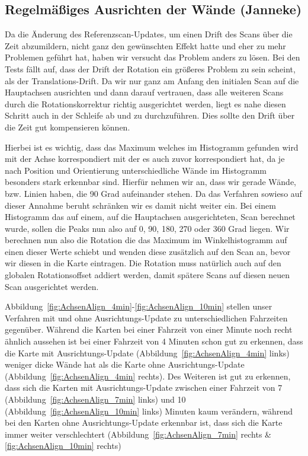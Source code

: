 \subsection{Regelmäßiges Ausrichten der Wände (Janneke)}

Da die Änderung des Referenzscan-Updates, um einen Drift des Scans über die Zeit abzumildern, nicht ganz den gewünschten Effekt hatte und eher zu mehr Problemen geführt hat, haben wir versucht das Problem anders zu lösen. Bei den Tests fällt auf, dass der Drift der Rotation ein größeres Problem zu sein scheint, als der Translations-Drift. Da wir nur ganz am Anfang den initialen Scan auf die Hauptachsen ausrichten und dann darauf vertrauen, dass alle weiteren Scans durch die Rotationskorrektur richtig ausgerichtet werden, liegt es nahe diesen Schritt auch in der Schleife ab und zu durchzuführen. Dies sollte den Drift über die Zeit gut kompensieren können.

Hierbei ist es wichtig, dass das Maximum welches im Histogramm gefunden wird mit der Achse korrespondiert mit der es auch zuvor korrespondiert hat, da je nach Position und Orientierung unterschiedliche Wände im Histogramm besonders stark erkennbar sind. Hierfür nehmen wir an, dass wir gerade Wände, bzw. Linien haben, die 90 Grad aufeinander stehen. Da das Verfahren sowieso auf dieser Annahme beruht schränken wir es damit nicht weiter ein. Bei einem Histogramm das auf einem, auf die Hauptachsen ausgerichteten, Scan berechnet wurde, sollen die Peaks nun also auf 0, 90, 180, 270 oder 360 Grad liegen. Wir berechnen nun also die Rotation die das Maximum im Winkelhistogramm auf einen dieser Werte schiebt und wenden diese zusätzlich auf den Scan an, bevor wir diesen in die Karte eintragen. Die Rotation muss natürlich auch auf den globalen Rotationsoffset addiert werden, damit spätere Scans auf diesen neuen Scan ausgerichtet werden.

Abbildung~\ref{fig:AchsenAlign_4min}-\ref{fig:AchsenAlign_10min} stellen unser Verfahren mit und ohne Ausrichtungs-Update zu unterschiedlichen Fahrzeiten gegenüber. Während die Karten bei einer Fahrzeit von einer Minute noch recht ähnlich aussehen ist bei einer Fahrzeit von 4 Minuten schon gut zu erkennen, dass die Karte mit Ausrichtungs-Update (Abbildung~\ref{fig:AchsenAlign_4min} links) weniger dicke Wände hat als die Karte ohne Ausrichtungs-Update (Abbildung~\ref{fig:AchsenAlign_4min} rechts). Des Weiteren ist gut zu erkennen, dass sich die Karten mit Ausrichtungs-Update zwischen einer Fahrzeit von 7 (Abbildung~\ref{fig:AchsenAlign_7min} links) und 10 (Abbildung~\ref{fig:AchsenAlign_10min} links) Minuten kaum verändern, während bei den Karten ohne Ausrichtungs-Update erkennbar ist, dass sich die Karte immer weiter verschlechtert (Abbildung~\ref{fig:AchsenAlign_7min} rechts \& \ref{fig:AchsenAlign_10min} rechts)  

